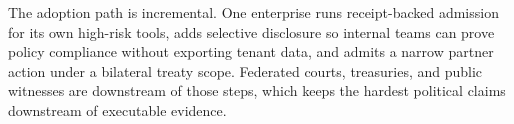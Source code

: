 The adoption path is incremental. One enterprise runs receipt-backed admission for its own high-risk tools, adds selective disclosure so internal teams can prove policy compliance without exporting tenant data, and admits a narrow partner action under a bilateral treaty scope. Federated courts, treasuries, and public witnesses are downstream of those steps, which keeps the hardest political claims downstream of executable evidence.
